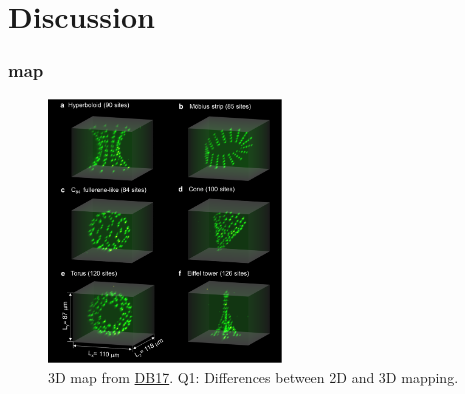\documentclass[18 pt]{beamer}
\begin{document}
\section{Discussion}
\begin{frame}
    \frametitle{map}
    \begin{figure}
        \includegraphics[height = 7cm]{map.png}
        \caption{3D map from \href{https://arxiv.org/abs/1712.02727}{DB17}. Q1: Differences between 2D and 3D mapping.}
    \end{figure}
\end{frame}
\end{document}
